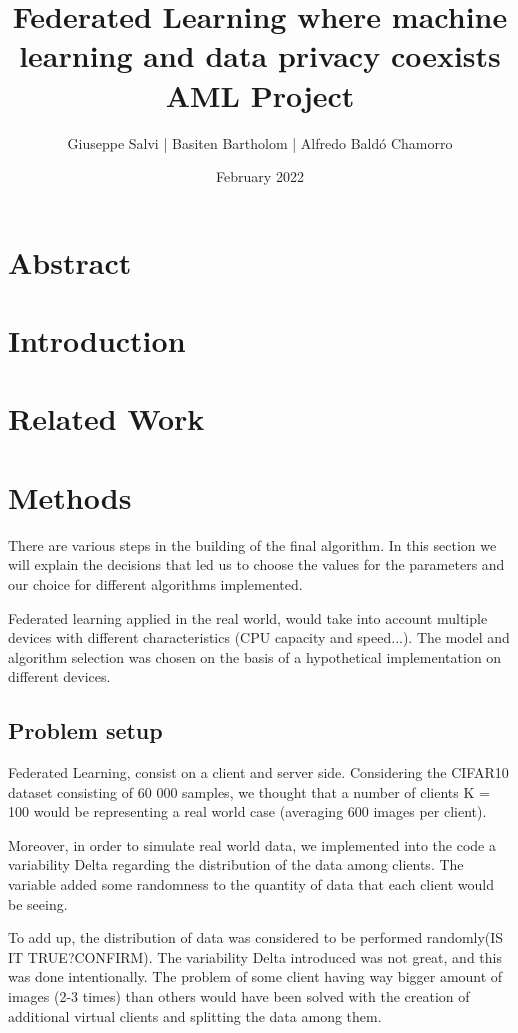 \documentclass[twocolumn]{article}
\title{Federated Learning where machine learning and data privacy coexists
\\AML Project}
\author{Giuseppe Salvi |
Basiten Bartholom |
Alfredo Baldó Chamorro}
\date{February 2022}
\begin{document}
\maketitle

\section{Abstract}
\section{Introduction} %
\section{Related Work} %
\section{Methods} %
There are various steps in the building of the final algorithm. In this section we will explain the decisions that led us to choose the values for the parameters and our choice for different algorithms implemented. 

Federated learning applied in the real world, would take into account multiple devices with different characteristics (CPU capacity and speed...). The model and algorithm selection was chosen on the basis of a hypothetical implementation on different devices.  

\subsection{Problem setup}
Federated Learning, consist on a client and server side. Considering the CIFAR10 dataset consisting of 60 000 samples, we thought that a number of clients K = 100 would be representing a real world case (averaging 600 images per client). 

Moreover, in order to simulate real world data, we implemented into the code a variability Delta regarding the distribution of the data among clients. The variable added some randomness to the quantity of data that each client would be seeing. 

To add up, the distribution of data was considered to be performed randomly(IS IT TRUE?CONFIRM). The variability Delta introduced was not great, and this was done intentionally. The problem of some client having way bigger amount of images (2-3 times) than others would have been solved with the creation of additional virtual clients and splitting the data among them. 
\end{document}
